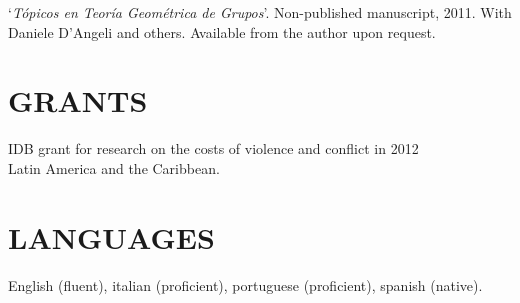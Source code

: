 \documentclass{res}
\begin{document}
\begin{resume}
								`\textit{T\'opicos en Teor\'{i}a Geom\'etrica de Grupos}'. Non-published manuscript, 2011. With Daniele D'Angeli and others. Available from the author upon request.
								
 
\section{GRANTS}

								IDB grant for research on the costs of violence and conflict in \hfill 2012\\
								Latin America and the Caribbean. 


 
\section{LANGUAGES}  

English (fluent), italian (proficient), portuguese (proficient), spanish (native).\\




\end{resume}
\end{document}
